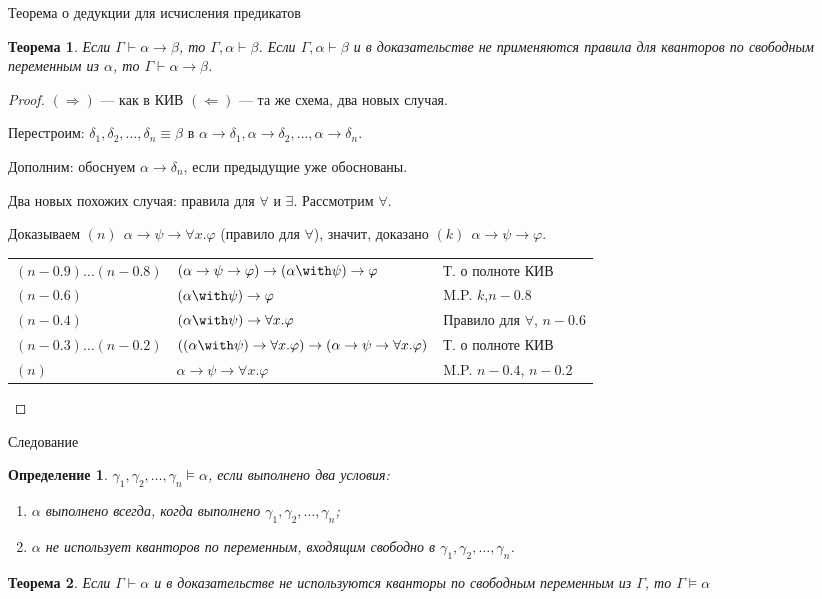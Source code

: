 \documentclass[aspectratio=169]{beamer}
\newtheorem{thm}{Теорема}[section]
\newtheorem{dfn}{Определение}[section]
\begin{document}
\begin{frame}{Теорема о дедукции для исчисления предикатов}
\begin{thm}Если $\Gamma\vdash\alpha\rightarrow\beta$, то $\Gamma,\alpha\vdash\beta$.
Если $\Gamma,\alpha\vdash\beta$ и в доказательстве не применяются правила для кванторов 
по свободным переменным из $\alpha$, то $\Gamma\vdash\alpha\rightarrow\beta$.\end{thm}
\begin{proof}$(\Rightarrow)$ --- как в КИВ \pause $(\Leftarrow)$ --- та же схема, два новых случая. \pause

Перестроим: $\delta_1, \delta_2, \dots, \delta_n \equiv \beta$ в $\alpha\rightarrow\delta_1, \alpha\rightarrow\delta_2, \dots, \alpha\rightarrow\delta_n$.

Дополним: обоснуем $\alpha\rightarrow\delta_n$, если предыдущие уже обоснованы.\pause

Два новых похожих случая: правила для $\forall$ и $\exists$. Рассмотрим $\forall$.

Доказываем $(n)\ \ \alpha\rightarrow\psi\rightarrow\forall x.\varphi$ (правило для $\forall$), значит, доказано  
$(k)\ \ \alpha\rightarrow\psi\rightarrow\varphi$. \pause
\begin{tabular}{lll}
$(n-0.9) \dots (n-0.8)$ & $(\alpha\rightarrow\psi\rightarrow\varphi)\rightarrow(\alpha\with\psi)\rightarrow\varphi$ & Т. о полноте КИВ\\
$(n-0.6)$ & $(\alpha\with\psi)\rightarrow\varphi$ & M.P. $k$,$n-0.8$\\\pause
$(n-0.4)$ & $(\alpha\with\psi)\rightarrow\forall x.\varphi$ & Правило для $\forall$, $n-0.6$\\\pause
$(n-0.3) \dots (n-0.2)$ & $((\alpha\with\psi)\rightarrow\forall x.\varphi)\rightarrow(\alpha\rightarrow\psi\rightarrow\forall x.\varphi)$ & Т. о полноте КИВ\\
$(n)$ & $\alpha\rightarrow\psi\rightarrow\forall x.\varphi$ & M.P. $n-0.4$, $n-0.2$
\end{tabular}

\end{proof}
\end{frame}


\begin{frame}{Следование}
\begin{dfn}$\gamma_1,\gamma_2,\dots,\gamma_n\models\alpha$, если выполнено два условия:
\begin{enumerate}
\item $\alpha$ выполнено всегда, когда выполнено $\gamma_1,\gamma_2,\dots,\gamma_n$;
\item $\alpha$ не использует кванторов по переменным, входящим свободно в $\gamma_1,\gamma_2,\dots,\gamma_n$.
\end{enumerate}
\end{dfn}

\begin{thm}Если $\Gamma\vdash\alpha$ и в доказательстве не используются кванторы по свободным
переменным из $\Gamma$, то $\Gamma\models\alpha$\end{thm}
\end{frame}
\end{document}

